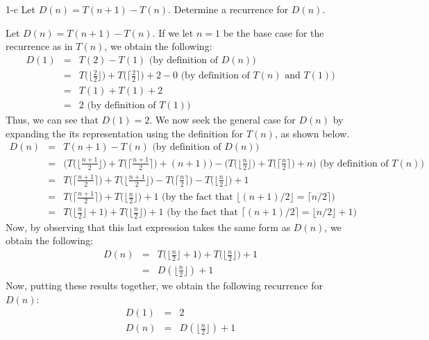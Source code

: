 \documentclass[11pt]{article}
\begin{document}
\begin{prob}{1-c}
Let $D(n) = T(n+1) - T(n)$. Determine a recurrence for $D(n)$.
\end{prob}
\begin{sol}

Let $D(n) = T(n+1) - T(n)$. If we let $n = 1$ be the base case for the recurrence as in $T(n)$, we obtain the following:
\begin{eqnarray*}
D(1) & = & T(2) - T(1) \text{ (by definition of $D(n)$)}\\
& = &  T\Big(\Big\lfloor\frac{2}{2}\Big\rfloor\Big) + T\Big(\Big\lceil\frac{2}{2}\Big\rceil\Big) + 2 - 0 \text{ (by definition of $T(n)$ and $T(1)$)}\\
& = & T(1) + T(1) + 2 \\
& = & 2 \text{ (by definition of $T(1)$)}
\end{eqnarray*}
Thus, we can see that $D(1) = 2$. We now seek the general case for $D(n)$ by expanding the its representation using the definition for $T(n)$, as shown below.
\begin{eqnarray*}
D(n) & = & T(n+1) - T(n) \text{ (by definition of $D(n)$)}\\
& = & \Bigg(T\Big(\Big\lfloor\frac{n+1}{2}\Big\rfloor\Big) + T\Big(\Big\lceil\frac{n+1}{2}\Big\rceil\Big) + (n+1)\Bigg) - \Bigg(T\Big(\Big\lfloor\frac{n}{2}\Big\rfloor\Big) + T\Big(\Big\lceil\frac{n}{2}\Big\rceil\Big) + n\Bigg) \text{ (by definition of $T(n)$)}\\
& = & T\Big(\Big\lceil\frac{n+1}{2}\Big\rceil\Big) + T\Big(\Big\lfloor\frac{n+1}{2}\Big\rfloor\Big) - T\Big(\Big\lceil\frac{n}{2}\Big\rceil\Big) - T\Big(\Big\lfloor\frac{n}{2}\Big\rfloor\Big) + 1 \\
& = & T\Big(\Big\lceil\frac{n+1}{2}\Big\rceil\Big) + T\Big(\Big\lfloor\frac{n}{2}\Big\rfloor\Big) + 1 \text{ (by the fact that $\lfloor (n+1)/2 \rfloor = \lceil n/2 \rceil$)} \\
& = & T\Big(\Big\lfloor\frac{n}{2}\Big\rfloor + 1\Big) + T\Big(\Big\lfloor\frac{n}{2}\Big\rfloor\Big) + 1 \text{ (by the fact that $\lceil (n+1)/2 \rceil = \lfloor n/2 \rfloor + 1$)}
\end{eqnarray*}
Now, by observing that this last expression takes the same form as $D(n)$, we obtain the following:
\begin{eqnarray*}
D(n) & = & T\Big(\Big\lfloor\frac{n}{2}\Big\rfloor + 1\Big) + T\Big(\Big\lfloor\frac{n}{2}\Big\rfloor\Big) + 1 \\
& = & D(\Big\lfloor\frac{n}{2}\Big\rfloor) + 1
\end{eqnarray*}
Now, putting these results together, we obtain the following recurrence for $D(n)$:
\begin{eqnarray*}
D(1) & = & 2 \\
D(n) & = & D(\Big\lfloor\frac{n}{2}\Big\rfloor) + 1
\end{eqnarray*}
\end{sol}
\end{document}
